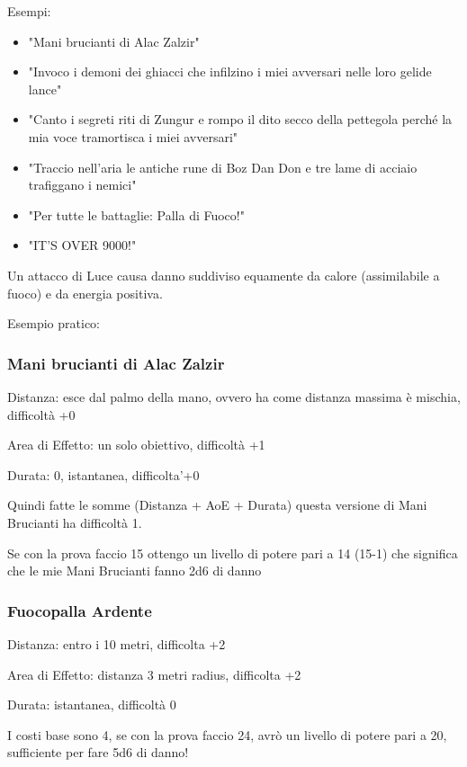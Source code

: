 \documentclass[a4paper,11pt,twoside,openany]{book}
\begin{document}
Esempi:
\begin{itemize}
	\item
	      "Mani brucianti di Alac Zalzir"
	\item
	      "Invoco i demoni dei ghiacci che infilzino i miei avversari nelle loro gelide lance"
	\item
	      "Canto i segreti riti di Zungur e rompo il dito secco della pettegola perché la mia voce tramortisca i miei avversari"
	\item
	      "Traccio nell'aria le antiche rune di Boz Dan Don e tre lame di acciaio trafiggano i nemici"
	\item
	      "Per tutte le battaglie: Palla di Fuoco!"
	\item
	      "IT'S OVER 9000!"
\end{itemize}
\bigskip

Un attacco di Luce causa danno suddiviso equamente da calore (assimilabile a fuoco) e da energia positiva.

Esempio pratico:

\subsubsection{Mani brucianti di Alac Zalzir}

Distanza: esce dal palmo della mano, ovvero ha come distanza massima è mischia, difficoltà +0

Area di Effetto: un solo obiettivo, difficoltà +1

Durata: 0, istantanea, difficolta'+0

Quindi fatte le somme (Distanza + AoE + Durata) questa versione di Mani Brucianti ha difficoltà 1.

Se con la prova faccio 15 ottengo un livello di potere pari a 14 (15-1) che significa che le mie Mani Brucianti fanno 2d6 di danno

\subsubsection{Fuocopalla Ardente}

Distanza: entro i 10 metri, difficolta +2

Area di Effetto: distanza 3 metri radius, difficolta +2

Durata: istantanea, difficoltà 0

I costi base sono 4, se con la prova faccio 24, avrò un livello di potere pari a 20, sufficiente per fare 5d6 di danno!
\end{document}
